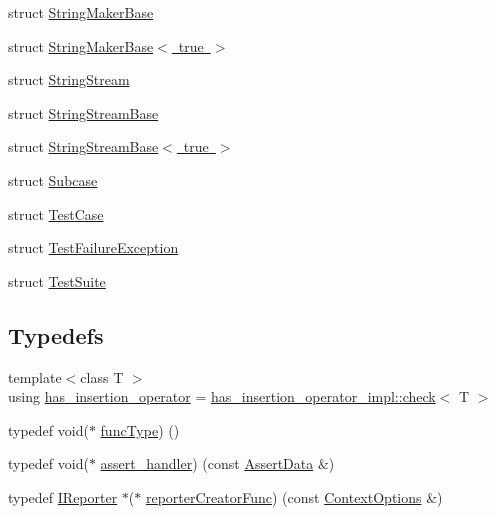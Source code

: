 \begin{DoxyCompactItemize}
\item 
struct \mbox{\hyperlink{structdoctest_1_1detail_1_1_string_maker_base}{String\+Maker\+Base}}
\item 
struct \mbox{\hyperlink{structdoctest_1_1detail_1_1_string_maker_base_3_01true_01_4}{String\+Maker\+Base$<$ true $>$}}
\item 
struct \mbox{\hyperlink{structdoctest_1_1detail_1_1_string_stream}{String\+Stream}}
\item 
struct \mbox{\hyperlink{structdoctest_1_1detail_1_1_string_stream_base}{String\+Stream\+Base}}
\item 
struct \mbox{\hyperlink{structdoctest_1_1detail_1_1_string_stream_base_3_01true_01_4}{String\+Stream\+Base$<$ true $>$}}
\item 
struct \mbox{\hyperlink{structdoctest_1_1detail_1_1_subcase}{Subcase}}
\item 
struct \mbox{\hyperlink{structdoctest_1_1detail_1_1_test_case}{Test\+Case}}
\item 
struct \mbox{\hyperlink{structdoctest_1_1detail_1_1_test_failure_exception}{Test\+Failure\+Exception}}
\item 
struct \mbox{\hyperlink{structdoctest_1_1detail_1_1_test_suite}{Test\+Suite}}
\end{DoxyCompactItemize}
\subsection*{Typedefs}
\begin{DoxyCompactItemize}
\item 
{\footnotesize template$<$class T $>$ }\\using \mbox{\hyperlink{namespacedoctest_1_1detail_a59ed49556ad14ee06e28c87f273535d3}{has\+\_\+insertion\+\_\+operator}} = \mbox{\hyperlink{structdoctest_1_1detail_1_1has__insertion__operator__impl_1_1check}{has\+\_\+insertion\+\_\+operator\+\_\+impl\+::check}}$<$ T $>$
\item 
typedef void($\ast$ \mbox{\hyperlink{namespacedoctest_1_1detail_a7b2c60631c5f4906b26acf2e6b0e6e45}{func\+Type}}) ()
\item 
typedef void($\ast$ \mbox{\hyperlink{namespacedoctest_1_1detail_a5b5db6997f20389de5735e3ee3439b95}{assert\+\_\+handler}}) (const \mbox{\hyperlink{structdoctest_1_1_assert_data}{Assert\+Data}} \&)
\item 
typedef \mbox{\hyperlink{structdoctest_1_1_i_reporter}{I\+Reporter}} $\ast$($\ast$ \mbox{\hyperlink{namespacedoctest_1_1detail_a030c0c44c25bdebe6a83858d1f454f72}{reporter\+Creator\+Func}}) (const \mbox{\hyperlink{structdoctest_1_1_context_options}{Context\+Options}} \&)
\end{DoxyCompactItemize}
